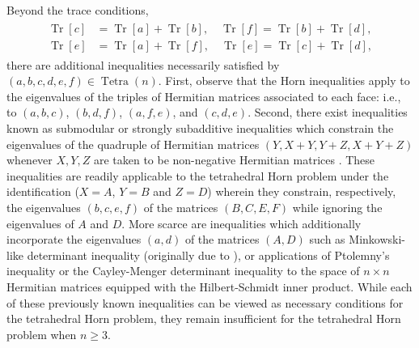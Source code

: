 \documentclass[pdflatex, sn-mathphys-num]{sn-jnl} %
\let\oldciteauthor=\citeauthor
\def\citeauthor#1{\hypersetup{citecolor=black}\oldciteauthor{#1}\hypersetup{citecolor=blue}}
\theoremstyle{plain}
\theoremstyle{definition}
\def\hypersetup#1{}%
\DeclareMathOperator{\Tr}{Tr}
\DeclareMathOperator{\Tetra}{Tetra}
\newcommand{\ea}{a}
\newcommand{\eb}{b}
\newcommand{\ec}{c}
\newcommand{\ed}{d}
\newcommand{\ee}{e}
\newcommand{\ef}{f}
\begin{document}
Beyond the trace conditions,
\begin{align}
    \label{eq:tet_trace_cond}
    \begin{split}
        \Tr[c] &= \Tr[a] + \Tr[b], \quad
        \Tr[f] = \Tr[b] + \Tr[d], \\
        \Tr[e] &= \Tr[a] + \Tr[f], \quad
        \Tr[e] = \Tr[c] + \Tr[d],
    \end{split}
\end{align}
there are additional inequalities necessarily satisfied by $(\ea,\eb,\ec,\ed,\ee,\ef) \in \Tetra(n)$.
First, observe that the Horn inequalities \cite{horn1962eigenvalues} apply to the eigenvalues of the triples of Hermitian matrices associated to each face: i.e., to $(\ea,\eb,\ec)$, $(\eb,\ed,\ef)$, $(\ea,\ef,\ee)$, and $(\ec,\ed,\ee)$.
Second, there exist inequalities known as submodular or strongly subadditive inequalities which constrain the eigenvalues of the quadruple of Hermitian matrices $(Y,X+Y,Y+Z,X+Y+Z)$ whenever $X,Y,Z$ are taken to be non-negative Hermitian matrices \cite{berndt2015hlawka, tie2011rearrangement, sagnol2013approximation, bouhtou2008optimization, friedland2013submodular, lewin2014family, sra2017determinantoverflow}.
These inequalities are readily applicable to the tetrahedral Horn problem under the identification ($X=A$, $Y=B$ and $Z=D$) wherein they constrain, respectively, the eigenvalues $(\eb,\ec,\ee,\ef)$ of the matrices $(B,C,E,F)$ while ignoring the eigenvalues of $A$ and $D$.
More scarce are inequalities which additionally incorporate the eigenvalues $(\ea,\ed)$ of the matrices $(A,D)$ such as Minkowski-like determinant inequality \cite[Section 6.2]{niculescu2023functions} (originally due to \citeauthor{courtade2016strengthening} \cite{courtade2016strengthening, sra2016reverseoverflow}), or applications of Ptolemny's inequality \cite{schoenberg1952remark} or the Cayley-Menger determinant inequality \cite[Equation 5.2]{sitharam2018handbook} to the space of $n\times n$ Hermitian matrices equipped with the Hilbert-Schmidt inner product.
While each of these previously known inequalities can be viewed as necessary conditions for the tetrahedral Horn problem, they remain insufficient for the tetrahedral Horn problem when $n\geq 3$.
\end{document}
